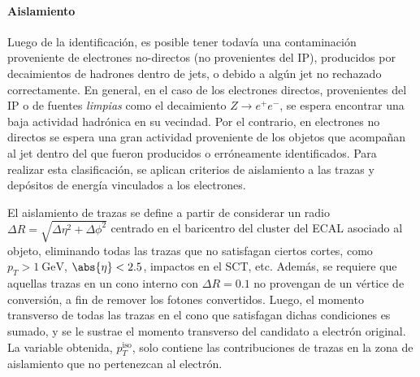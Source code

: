 \paragraph{Aislamiento}

Luego de la identificación, es posible tener todavía una contaminación proveniente de electrones no-directos (no provenientes del IP), producidos por decaimientos de hadrones dentro de jets, o debido a algún jet no rechazado correctamente. En general, en el caso de los electrones directos, provenientes del IP o de fuentes \textit{limpias} como el decaimiento $Z \to e^+ e^-$, se espera encontrar una baja actividad hadrónica en su vecindad. Por el contrario, en electrones no directos se espera una gran actividad proveniente de los objetos que acompañan al jet dentro del que fueron producidos o erróneamente identificados. Para realizar esta clasificación, se aplican criterios de aislamiento a las trazas y depósitos de energía vinculados a los electrones.

El aislamiento de trazas se define a partir de considerar un radio $\Delta R = \sqrt{\Delta\eta^2 + \Delta\phi^2}$ centrado en el baricentro del cluster del ECAL asociado al objeto, eliminando todas las trazas que no satisfagan ciertos cortes, como $p_T > \SI{1}{\GeV}$, $\abs{\eta} < 2.5$, impactos en el SCT, etc. Además, se requiere que aquellas trazas en un cono interno con $\Delta R = 0.1$ no provengan de un vértice de conversión, a fin de remover los fotones convertidos. Luego, el momento transverso de todas las trazas en el cono que satisfagan dichas condiciones es sumado, y se le sustrae el momento transverso del candidato a electrón original. La variable obtenida, $p_T^{\text{iso}}$, solo contiene las contribuciones de trazas en la zona de aislamiento que no pertenezcan al electrón.

